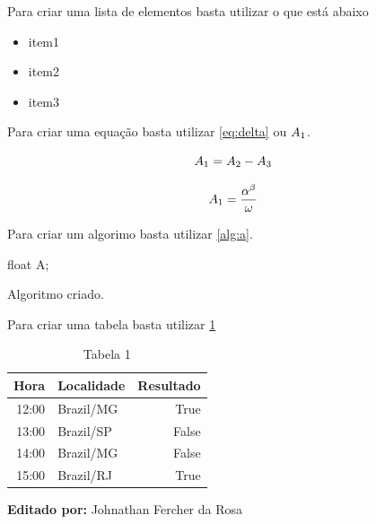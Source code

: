 Para criar uma lista de elementos basta utilizar o que está abaixo

\begin{itemize}
\item item1
\item item2
\item item3
\end{itemize}



Para criar uma equação basta utilizar \ref{eq:delta} ou $\fontsize{14}{14}{A}_{1}$.

\begin{equation}
	\fontsize{14}{14}{A}_{1} = {A}_{2} - {A}_{3}
	\label{eq:delta}
\end{equation}

\begin{equation}
	\fontsize{14}{14}{A}_{1} = \frac{{\alpha}^{\beta}}{\omega}
	\label{eq:delta}
\end{equation}



Para criar um algorimo basta utilizar \ref{alg:a}.

\begin{algorithm}[H]
float A;\\

\caption{Algoritmo criado.}
\label{alg:a}
\end{algorithm}



Para criar uma tabela basta utilizar \ref{tab:1}

\begin{table}[!htbp]
\centering
\caption{Tabela 1}
\label{tab:1}
\begin{tabular}{rlr}
 
Hora & Localidade & Resultado \\
\hline                             
12:00			&	Brazil/MG	&	True	\\
13:00			&	Brazil/SP	&	False	\\
14:00			&	Brazil/MG	&	False	\\
15:00			&	Brazil/RJ	&	True	\\
\end{tabular}
\end{table}

\textbf{Editado por:} Johnathan Fercher da Rosa

